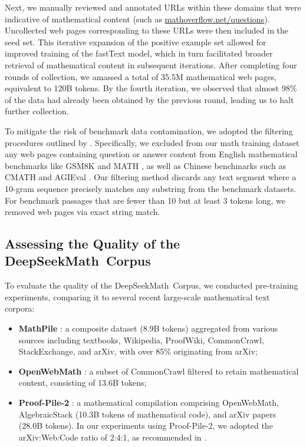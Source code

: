 Next, we manually reviewed and annotated URLs within these domains that were indicative of mathematical content (such as \url{mathoverflow.net/questions}). Uncollected web pages corresponding to these URLs were then included in the seed set. This iterative expansion of the positive example set allowed for improved training of the fastText model, which in turn facilitated broader retrieval of mathematical content in subsequent iterations. After completing four rounds of collection, we amassed a total of 35.5M mathematical web pages, equivalent to 120B tokens. By the fourth iteration, we observed that almost 98\% of the data had already been obtained by the previous round, leading us to halt further collection.

To mitigate the risk of benchmark data contamination, we adopted the filtering procedures outlined by \cite{deepseek-coder}. Specifically, we excluded from our math training dataset any web pages containing question or answer content from English mathematical benchmarks like GSM8K \citep{gsm8k} and MATH \citep{MATH}, as well as Chinese benchmarks such as CMATH \citep{wei2023cmath} and AGIEval \citep{agieval}. Our filtering method discards any text segment where a 10-gram sequence precisely matches any substring from the benchmark datasets. For benchmark passages that are fewer than 10 but at least 3 tokens long, we removed web pages via exact string match.

\subsection{Assessing the Quality of the DeepSeekMath~Corpus}

To evaluate the quality of the DeepSeekMath~Corpus, we conducted pre-training experiments, comparing it to several recent large-scale mathematical text corpora:

\begin{itemize}[topsep=0pt]
    \item \textbf{MathPile} \citep{mathpile}: a composite dataset (8.9B tokens) aggregated from various sources including textbooks, Wikipedia, ProofWiki, CommonCrawl, StackExchange, and arXiv, with over 85\% originating from arXiv;
    \item \textbf{OpenWebMath} \citep{openwebmath}: a subset of CommonCrawl filtered to retain mathematical content, consisting of 13.6B tokens;
    \item \textbf{Proof-Pile-2} \citep{llemma}: a mathematical compilation comprising OpenWebMath, AlgebraicStack (10.3B tokens of mathematical code), and arXiv papers (28.0B tokens). In our experiments using Proof-Pile-2, we adopted the arXiv:Web:Code ratio of 2:4:1, as recommended in \cite{llemma}.
\end{itemize}


